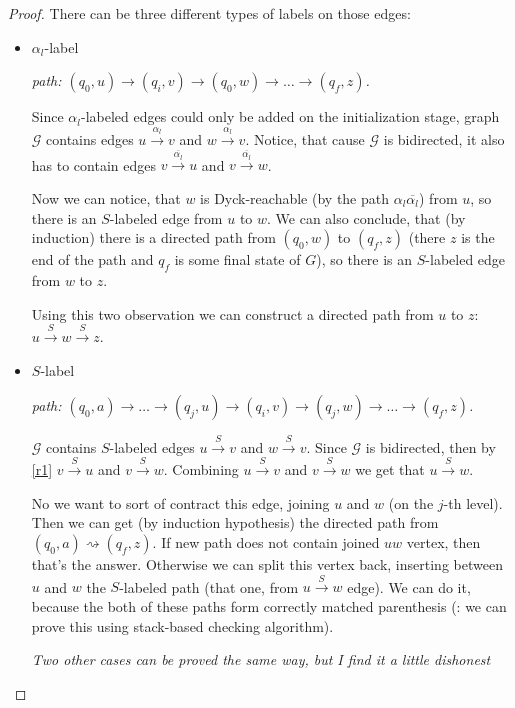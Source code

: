 \begin{proof}
  There can be three different types of labels on those edges:

  \begin{itemize}
    \item $\alpha_l$-label

      \textit{path: $(q_0, u) \rightarrow (q_i, v) \rightarrow (q_0, w) \rightarrow \dots \rightarrow (q_f, z)$.}

      Since $\alpha_l$-labeled edges could only be added on the initialization stage, 
      graph $\mathcal{G}$ contains edges $u \xrightarrow{\alpha_l} v$ and $w \xrightarrow{\alpha_l} v$. Notice, that cause $\mathcal{G}$ is bidirected, it also has to contain edges $v \xrightarrow{\overline{\alpha_l}} u$ and $v \xrightarrow{\overline{\alpha_l}} w$.

      Now we can notice, that $w$ is Dyck-reachable (by the path $\alpha_l \overline{\alpha_l}$) from $u$, so there is an $S$-labeled edge from $u$ to $w$. We can also conclude, that (by induction) there is a directed path from $(q_0, w)$ to $(q_f, z)$ (there $z$ is the end of the path and $q_f$ is some final state of $G$), so there is an $S$-labeled edge from $w$ to $z$. 

      Using this two observation we can construct a directed path from $u$ to $z$: $u \xrightarrow{S} w \xrightarrow{S} z$. 
    \item $S$-label

      \textit{path: $(q_0, a) \rightarrow \dots \rightarrow (q_j, u) \rightarrow (q_i, v) \rightarrow (q_j, w) \rightarrow \dots \rightarrow (q_f, z)$.}

      $\mathcal{G}$ contains $S$-labeled edges $u \xrightarrow{S} v$ and $w \xrightarrow{S} v$. Since $\mathcal{G}$ is bidirected, then by \ref{r1} $v \xrightarrow{S} u$ and $v \xrightarrow{S} w$. Combining $u \xrightarrow{S} v$ and $v \xrightarrow{S} w$ we get that $u \xrightarrow{S} w$. 

      No we want to sort of contract this edge, joining $u$ and $w$ (on the $j$-th level). Then we can get (by induction hypothesis) the directed path from $(q_0, a) \rightsquigarrow (q_f, z)$. If new path does not contain joined $uw$ vertex, then that's the answer. Otherwise we can split this vertex back, inserting between $u$ and $w$ the $S$-labeled path (that one, from $u \xrightarrow{S} w$ edge). We can do it, because the both of these paths form correctly matched parenthesis ({\color{red}{TODO}}: we can prove this using stack-based checking algorithm).

      \textit{Two other cases can be proved the same way, but I find it a little dishonest}


\end{itemize}
\end{proof}
